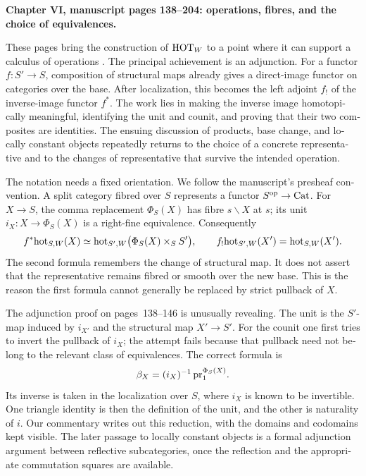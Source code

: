 \begin{otherlanguage}{english}
\noindent\textbf{Chapter VI, manuscript pages 138--204: operations, fibres, and the choice of equivalences.}

These pages bring the construction of $\mathrm{HOT}_W$ to a point where it can support a calculus of operations \citep{Grothendieck1990VI}. The principal achievement is an adjunction. For a functor $f:S'\to S$, composition of structural maps already gives a direct-image functor on categories over the base. After localization, this becomes the left adjoint $f_!$ of the inverse-image functor $f^*$. The work lies in making the inverse image homotopically meaningful, identifying the unit and counit, and proving that their two composites are identities. The ensuing discussion of products, base change, and locally constant objects repeatedly returns to the choice of a concrete representative and to the changes of representative that survive the intended operation.

The notation needs a fixed orientation. We follow the manuscript's presheaf convention. A split category fibred over $S$ represents a functor $S^{\mathrm{op}}\to\mathrm{Cat}$. For $X\to S$, the comma replacement $\Phi_S(X)$ has fibre $s\backslash X$ at $s$; its unit $i_X:X\to\Phi_S(X)$ is a right-fine equivalence. Consequently
\[
 f^*\mathrm{hot}_{S,W}(X)
 \simeq\mathrm{hot}_{S',W}\bigl(\Phi_S(X)\times_S S'\bigr),
 \qquad
 f_!\mathrm{hot}_{S',W}(X')=\mathrm{hot}_{S,W}(X').
\]
The second formula remembers the change of structural map. It does not assert that the representative remains fibred or smooth over the new base. This is the reason the first formula cannot generally be replaced by strict pullback of $X$.

The adjunction proof on pages~138--146 is unusually revealing. The unit is the $S'$-map induced by $i_{X'}$ and the structural map $X'\to S'$. For the counit one first tries to invert the pullback of $i_X$; the attempt fails because that pullback need not belong to the relevant class of equivalences. The correct formula is
\[
 \beta_X=(i_X)^{-1}\,\mathrm{pr}_1^{\Phi_S(X)}.
\]
Its inverse is taken in the localization over $S$, where $i_X$ is known to be invertible. One triangle identity is then the definition of the unit, and the other is naturality of $i$. Our commentary writes out this reduction, with the domains and codomains kept visible. The later passage to locally constant objects is a formal adjunction argument between reflective subcategories, once the reflection and the appropriate commutation squares are available.


\end{otherlanguage}
